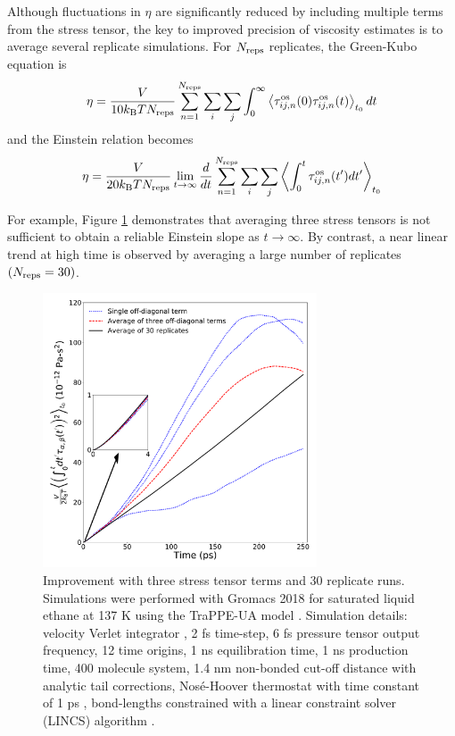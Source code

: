 \documentclass[9pt,bestpractices]{livecoms}
\begin{document}
Although fluctuations in $\eta$ are significantly reduced by including multiple terms from the stress tensor, the key to improved precision of viscosity estimates is to average several replicate simulations. For $N_{\rm reps}$ replicates, the Green-Kubo equation is
\begin{equation}
\eta = \frac{V}{10 k_{\rm B} T N_{\rm reps}} \sum_{n=1}^{N_{\rm reps}} \sum_i \sum_j \int_0^\infty \left\langle \tau_{ij,n}^{\rm os}(0)\tau_{ij,n}^{\rm os}(t) \right\rangle_{t_0} dt
\label{eq:GKwonder_replicates}
\end{equation}
and the Einstein relation becomes
\begin{equation}
\eta = \displaystyle \frac{V}{20 k_{\rm B} T N_{\rm reps}} \lim_{t\to\infty} \frac{d}{dt} \sum_{n=1}^{N_{\rm reps}} \sum_i \sum_j \left\langle \int_0^t \tau_{ij,n}^{\rm os}(t') dt' \right\rangle_{t_0}
\label{eq:Einwonder_replicates}
\end{equation}

For example, Figure \ref{fig:Einstein_3terms_30replicates} demonstrates that averaging three stress tensors is not sufficient to obtain a reliable Einstein slope as $t \to \infty$. By contrast, a near linear trend at high time is observed by averaging a large number of replicates $(N_{\rm reps} = 30)$.

\begin{figure}[htb!]
	\centering
	\includegraphics[width=3.2in]{Einstein_3terms_30replicates.pdf}
	\caption{Improvement with three stress tensor terms and 30 replicate runs. Simulations were performed with Gromacs 2018 for saturated liquid ethane at 137 K using the TraPPE-UA model \cite{Martin1998}. Simulation details: velocity Verlet integrator \cite{Swope1982}, 2 fs time-step, 6 fs pressure tensor output frequency, 12 time origins, 1 ns equilibration time, 1 ns production time, 400 molecule system, 1.4 nm non-bonded cut-off distance with analytic tail corrections, Nos{\'e}-Hoover thermostat with time constant of 1 ps \cite{Hoover1985}, bond-lengths constrained with a linear constraint solver (LINCS) algorithm \cite{GROMACS,Hess1998,Hess2008_PLINCS}.}
	\label{fig:Einstein_3terms_30replicates}
\end{figure}
\end{document}
